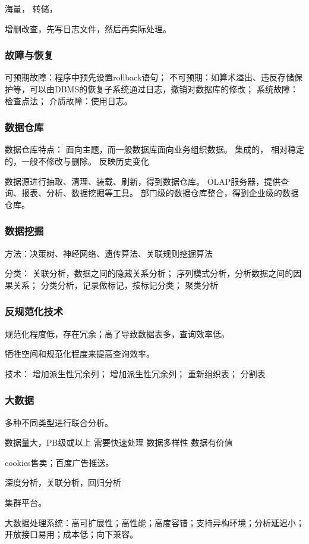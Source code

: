 \documentclass[UTF8]{../computerUniverse}
\begin{document}
海量，
转储，

增删改查，先写日志文件，然后再实际处理。

\subsubsection{故障与恢复}
可预期故障：程序中预先设置rollback语句；
不可预期：如算术溢出、违反存储保护等，可以由DBMS的恢复子系统通过日志，撤销对数据库的修改；
系统故障：检查点法；
介质故障：使用日志。

\subsubsection{数据仓库}
数据仓库特点：
面向主题，而一般数据库面向业务组织数据。
集成的，
相对稳定的，一般不修改与删除。
反映历史变化

数据源进行抽取、清理、装载、刷新，得到数据仓库。
OLAP服务器，提供查询、报表、分析、数据挖掘等工具。
部门级的数据仓库整合，得到企业级的数据仓库。

\subsubsection{数据挖掘}
方法：决策树、神经网络、遗传算法、关联规则挖掘算法

分类：
关联分析，数据之间的隐藏关系分析；
序列模式分析，分析数据之间的因果关系；
分类分析，记录做标记，按标记分类；
聚类分析


\subsubsection{反规范化技术}
规范化程度低，存在冗余；高了导致数据表多，查询效率低。

牺牲空间和规范化程度来提高查询效率。

技术：
增加派生性冗余列；
增加派生性冗余列；
重新组织表；
分割表


\subsubsection{大数据}
多种不同类型进行联合分析。

数据量大，PB级或以上
需要快速处理
数据多样性
数据有价值

cookies售卖；百度广告推送。

深度分析，关联分析，回归分析

集群平台。

大数据处理系统：高可扩展性；高性能；高度容错；支持异构环境；分析延迟小；开放接口易用；成本低；向下兼容。
\end{document}
